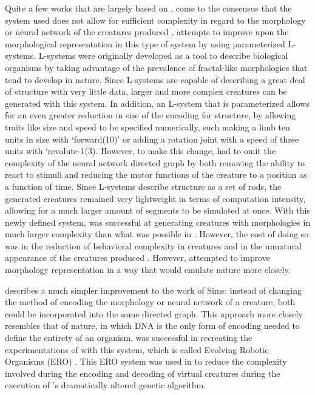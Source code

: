 \documentclass[12pt]{article}
\begin{document}
Quite a few works that are largely based on \cite{sims1994evolving}, come to the consensus that the system used does not allow for sufficient complexity in regard to the morphology or neural network of the creatures produced \cite{lehman2011evolving} \cite{hornby2001evolving}.
\cite{hornby2001evolving} attempts to improve upon the morphological representation in this type of system by using parameterized L-systems.
L-systems were originally developed as a tool to describe biological organisms by taking advantage of the prevalence of fractal-like morphologies that tend to develop in nature.
Since L-systems are capable of describing a great deal of structure with very little data, larger and more complex creatures can be generated with this system.
In addition, an L-system that is parameterized allows for an even greater reduction in size of the encoding for structure, by allowing traits like size and speed to be specified numerically, such making a limb ten units in size with ‘forward(10)’ or adding a rotation joint with a speed of three units with ‘revolute-1(3).
However, to make this change, \cite{hornby2001evolving} had to omit the complexity of the neural network directed graph by both removing the ability to react to stimuli and reducing the motor functions of the creature to a position as a function of time.
Since L-systems describe structure as a set of rods, the generated creatures remained very lightweight in terms of computation intensity, allowing for a much larger amount of segments to be simulated at once.
With this newly defined system, \cite{hornby2001evolving} was successful at generating creatures with morphologies in much larger complexity than what was possible in \cite{sims1994evolving}.
However, the cost of doing so was in the reduction of behavioral complexity in creatures and in the unnatural appearance of the creatures produced \cite{hornby2001evolving}.
However, \cite{lehman2011evolving} attempted to improve morphology representation in a way that would emulate nature more closely.

\cite{lehman2011evolving} describes a much simpler improvement to the work of Sims: instead of changing the method of encoding the morphology or neural network of a creature, both could be incorporated into the same directed graph.
This approach more closely resembles that of nature, in which DNA is the only form of encoding needed to define the entirety of an organism.
\cite{lehman2011evolving} was successful in recreating the experimentations of \cite{sims1994evolving} with this system, which is called Evolving Robotic Organisms (ERO) \cite{lehman2011evolving}.
This ERO system was used in \cite{lehman2011evolving} to reduce the complexity involved during the encoding and decoding of virtual creatures during the execution of \cite{lehman2011evolving}’s dramatically altered genetic algorithm.
\end{document}
